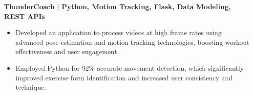 \documentclass{article}
\begin{document}
\noindent \textbf{ThunderCoach $\mid$ {\small Python, Motion Tracking, Flask, Data Modeling, REST APIs}}
\begin{itemize}[noitemsep,nolistsep,leftmargin=*]
\item {\small Developed an application to process videos at high frame rates using advanced pose estimation and motion tracking technologies, boosting workout effectiveness and user engagement.}
\item {\small Employed Python for 92\% accurate movement detection, which significantly improved exercise form identification and increased user consistency and technique.}\\
\end{itemize}



\end{document}

